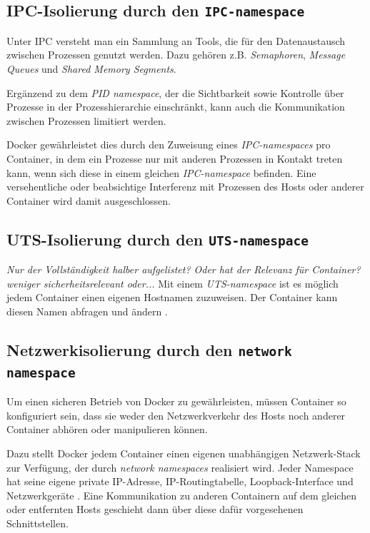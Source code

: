 \documentclass[../main.tex]{subfiles}
\begin{document}

    \subsection{\acrshort{IPC}-Isolierung durch den \texttt{\acrshort{IPC}-namespace}}
			Unter \acrshort{IPC} versteht man ein Sammlung an Tools, die für den Datenaustausch zwischen Prozessen genutzt werden. Dazu gehören z.B. \emph{Semaphoren}, \emph{Message Queues} und \emph{Shared Memory Segments}.

			Ergänzend zu dem \emph{\acrshort{PID} namespace}, der die Sichtbarkeit sowie Kontrolle über Prozesse in der Prozesshierarchie einschränkt, kann auch die Kommunikation zwischen Prozessen limitiert werden.

			Docker gewährleistet dies durch den Zuweisung eines \emph{\acrshort{IPC}-namespaces} pro Container, in dem ein Prozesse nur mit anderen Prozessen in Kontakt treten kann, wenn sich diese in einem gleichen \emph{\acrshort{IPC}-namespace} befinden. Eine versehentliche oder beabsichtige Interferenz mit Prozessen des Hosts oder anderer Container wird damit ausgeschlossen.

			\cite[S.4]{dockerSec1}


    \subsection{\acrshort{UTS}-Isolierung durch den \texttt{\acrshort{UTS}-namespace}}
			\emph{Nur der Vollständigkeit halber aufgelistet? Oder hat der Relevanz für Container?}
			\emph{weniger sicherheitsrelevant oder...}
			Mit einem \emph{\acrshort{UTS}-namespace} ist es möglich jedem Container einen eigenen Hostnamen zuzuweisen. Der Container kann diesen Namen abfragen und ändern \cite[S.3]{virtVSContainer}.
    \subsection{Netzwerkisolierung durch den \texttt{network namespace}}
			Um einen sicheren Betrieb von Docker zu gewährleisten, müssen Container so konfiguriert sein, dass sie weder den Netzwerkverkehr des Hosts noch anderer Container abhören oder manipulieren können.

			Dazu stellt Docker jedem Container einen eigenen unabhängigen Netzwerk-Stack zur Verfügung, der durch \emph{network namespaces} realisiert wird. Jeder Namespace hat seine eigene private IP-Adresse, IP-Routingtabelle, Loopback-Interface und Netzwerkgeräte \cite[S.2+3]{virtVSContainer}. Eine Kommunikation zu anderen Containern auf dem gleichen oder entfernten Hosts geschieht dann über diese dafür vorgesehenen Schnittstellen.
\end{document}
